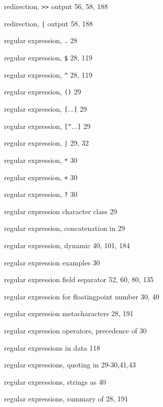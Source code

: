 \begin{multicols}{3}
\hangindent=3pc  redirection, \verb'>>' output 56, 58, 188

\hangindent=3pc  redirection, \verb'|' output 58, 188

\hangindent=3pc  regular expression, \verb'.' 28

\hangindent=3pc  regular expression, \verb'$' 28, 119

\hangindent=3pc  regular expression, \verb'^' 28, 119

\hangindent=3pc  regular expression, \verb'()' 29

\hangindent=3pc  regular expression, \verb'['...\verb']' 29

\hangindent=3pc  regular expression, \verb'[^'...\verb']' 29

\hangindent=3pc  regular expression, \verb'|' 29, 32

\hangindent=3pc  regular expression, \verb'*' 30

\hangindent=3pc  regular expression, \verb'+' 30

\hangindent=3pc  regular expression, \verb'?' 30

\hangindent=3pc  regular expression character class 29

\hangindent=3pc  regular expression, concatenation in 29

\hangindent=3pc  regular expression, dynamic 40, 101, 184

\hangindent=3pc  regular expression examples 30

\hangindent=3pc  regular expression field separator 52, 60, 80, 135

\hangindent=3pc  regular expression for floatingpoint number 30, 40



\hangindent=3pc  regular expression metacharacters 28, 191

\hangindent=3pc  regular expression operators, precedence of 30

\hangindent=3pc  regular expressions in data 118

\hangindent=3pc  regular expressions, quoting in 29-30,41,43

\hangindent=3pc  regular expressions, strings as 40

\hangindent=3pc  regular expressions, summary of 28, 191


\end{multicols}
